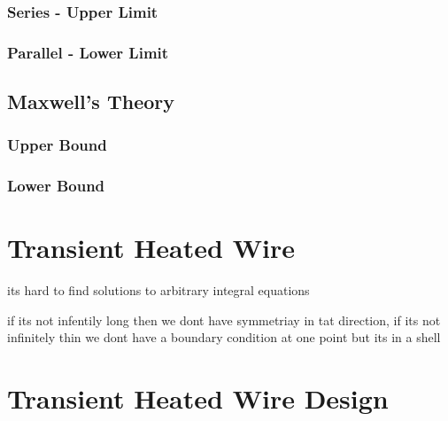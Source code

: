 \documentclass{article}
\begin{document}
	\subsubsection{Series - Upper Limit}
	\subsubsection{Parallel - Lower Limit}
	\subsection{Maxwell's Theory}
	\subsubsection{Upper Bound}
	\subsubsection{Lower Bound}

\newpage	
\section{Transient Heated Wire}
its hard to find solutions to arbitrary integral equations

if its not infentily long then we dont have symmetriay in tat direction, if its not infinitely thin we dont have a boundary condition at one point but its in a shell

\newpage
\section{Transient Heated Wire Design}

\newpage



\end{document}
